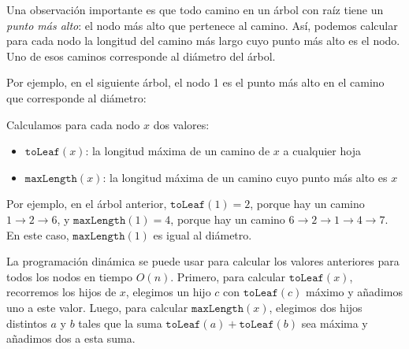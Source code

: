Una observación importante es que todo camino
en un árbol con raíz tiene un \emph{punto más alto}:
el nodo más alto que pertenece al camino.
Así, podemos calcular para cada nodo la longitud
del camino más largo cuyo punto más alto es el nodo.
Uno de esos caminos corresponde al diámetro del árbol.

Por ejemplo, en el siguiente árbol,
el nodo 1 es el punto más alto en el camino
que corresponde al diámetro:
\begin{center}
\end{center}

Calculamos para cada nodo $x$ dos valores:
\begin{itemize}
\item $\texttt{toLeaf}(x)$: la longitud máxima de un camino de $x$ a cualquier hoja
\item $\texttt{maxLength}(x)$: la longitud máxima de un camino
cuyo punto más alto es $x$
\end{itemize}
Por ejemplo, en el árbol anterior,
$\texttt{toLeaf}(1)=2$, porque hay un camino
$1 \rightarrow 2 \rightarrow 6$,
y $\texttt{maxLength}(1)=4$,
porque hay un camino
$6 \rightarrow 2 \rightarrow 1 \rightarrow 4 \rightarrow 7$.
En este caso, $\texttt{maxLength}(1)$ es igual al diámetro.

La programación dinámica se puede usar para calcular los
valores anteriores para todos los nodos en tiempo $O(n)$.
Primero, para calcular $\texttt{toLeaf}(x)$,
recorremos los hijos de $x$,
elegimos un hijo $c$ con $\texttt{toLeaf}(c)$ máximo
y añadimos uno a este valor.
Luego, para calcular $\texttt{maxLength}(x)$,
elegimos dos hijos distintos $a$ y $b$
tales que la suma $\texttt{toLeaf}(a)+\texttt{toLeaf}(b)$
sea máxima y añadimos dos a esta suma.

